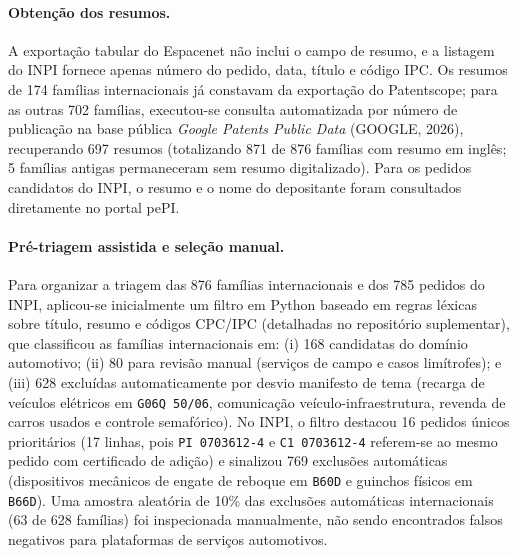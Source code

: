 \documentclass[12pt,a4paper]{article}
\begin{document}
\paragraph{Obtenção dos resumos.} A exportação tabular do Espacenet não inclui o campo de resumo, e a listagem do INPI fornece apenas número do pedido, data, título e código IPC. Os resumos de 174 famílias internacionais já constavam da exportação do Patentscope; para as outras 702 famílias, executou-se consulta automatizada por número de publicação na base pública \textit{Google Patents Public Data} (GOOGLE, 2026), recuperando 697 resumos (totalizando 871 de 876 famílias com resumo em inglês; 5 famílias antigas permaneceram sem resumo digitalizado). Para os pedidos candidatos do INPI, o resumo e o nome do depositante foram consultados diretamente no portal pePI.

\paragraph{Pré-triagem assistida e seleção manual.} Para organizar a triagem das 876 famílias internacionais e dos 785 pedidos do INPI, aplicou-se inicialmente um filtro em Python baseado em regras léxicas sobre título, resumo e códigos CPC/IPC (detalhadas no repositório suplementar), que classificou as famílias internacionais em: (i) 168 candidatas do domínio automotivo; (ii) 80 para revisão manual (serviços de campo e casos limítrofes); e (iii) 628 excluídas automaticamente por desvio manifesto de tema (recarga de veículos elétricos em \texttt{G06Q 50/06}, comunicação veículo-infraestrutura, revenda de carros usados e controle semafórico). No INPI, o filtro destacou 16 pedidos únicos prioritários (17 linhas, pois \texttt{PI 0703612-4} e \texttt{C1 0703612-4} referem-se ao mesmo pedido com certificado de adição) e sinalizou 769 exclusões automáticas (dispositivos mecânicos de engate de reboque em \texttt{B60D} e guinchos físicos em \texttt{B66D}). Uma amostra aleatória de 10\% das exclusões automáticas internacionais (63 de 628 famílias) foi inspecionada manualmente, não sendo encontrados falsos negativos para plataformas de serviços automotivos.
\end{document}
